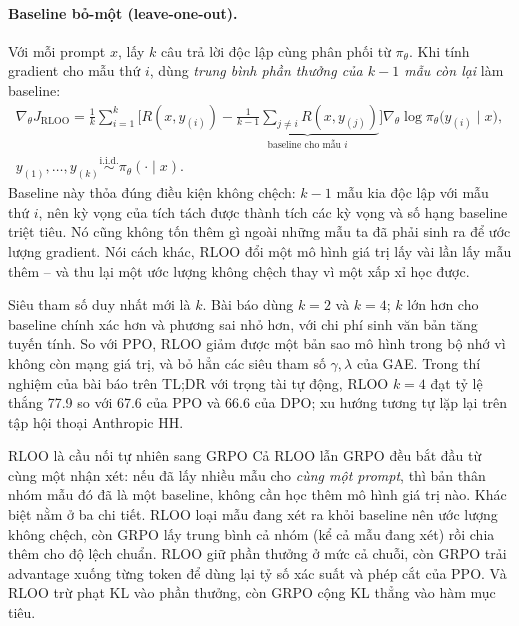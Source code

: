 \paragraph{Baseline bỏ-một (leave-one-out).}
Với mỗi prompt \( x \), lấy \( k \) câu trả lời độc lập cùng phân phối từ \( \pi_{\theta} \). Khi tính gradient cho mẫu thứ \( i \), dùng \emph{trung bình phần thưởng của \( k-1 \) mẫu còn lại} làm baseline:
\[
\begin{gathered}
    \nabla_{\theta} J_{\text{RLOO}}
    = \frac{1}{k}\sum_{i=1}^{k}
    \Big[
        R(x, y_{(i)}) - \underbrace{\frac{1}{k-1}\sum_{j \neq i} R(x, y_{(j)})}_{\text{baseline cho mẫu } i}
    \Big]
    \nabla_{\theta} \log \pi_{\theta}\big(y_{(i)} \mid x\big),
    \\[4pt]
    y_{(1)}, \dots, y_{(k)} \overset{\text{i.i.d.}}{\sim} \pi_{\theta}(\cdot \mid x).
\end{gathered}
\]
Baseline này thỏa đúng điều kiện không chệch: \( k-1 \) mẫu kia độc lập với mẫu thứ \( i \), nên kỳ vọng của tích tách được thành tích các kỳ vọng và số hạng baseline triệt tiêu. Nó cũng không tốn thêm gì ngoài những mẫu ta đã phải sinh ra để ước lượng gradient. Nói cách khác, RLOO đổi một mô hình giá trị lấy vài lần lấy mẫu thêm -- và thu lại một ước lượng không chệch thay vì một xấp xỉ học được.

Siêu tham số duy nhất mới là \( k \). Bài báo dùng \( k = 2 \) và \( k = 4 \); \( k \) lớn hơn cho baseline chính xác hơn và phương sai nhỏ hơn, với chi phí sinh văn bản tăng tuyến tính. So với PPO, RLOO giảm được một bản sao mô hình trong bộ nhớ vì không còn mạng giá trị, và bỏ hẳn các siêu tham số \( \gamma, \lambda \) của GAE. Trong thí nghiệm của bài báo trên TL;DR với trọng tài tự động, RLOO \( k=4 \) đạt tỷ lệ thắng 77.9 so với 67.6 của PPO và 66.6 của DPO; xu hướng tương tự lặp lại trên tập hội thoại Anthropic HH.

\begin{keyidea}{RLOO là cầu nối tự nhiên sang GRPO}
Cả RLOO lẫn GRPO đều bắt đầu từ cùng một nhận xét: nếu đã lấy nhiều mẫu cho \emph{cùng một prompt}, thì bản thân nhóm mẫu đó đã là một baseline, không cần học thêm mô hình giá trị nào. Khác biệt nằm ở ba chi tiết. RLOO loại mẫu đang xét ra khỏi baseline nên ước lượng không chệch, còn GRPO lấy trung bình cả nhóm (kể cả mẫu đang xét) rồi chia thêm cho độ lệch chuẩn. RLOO giữ phần thưởng ở mức cả chuỗi, còn GRPO trải advantage xuống từng token để dùng lại tỷ số xác suất và phép cắt của PPO. Và RLOO trừ phạt KL vào phần thưởng, còn GRPO cộng KL thẳng vào hàm mục tiêu.
\end{keyidea}

